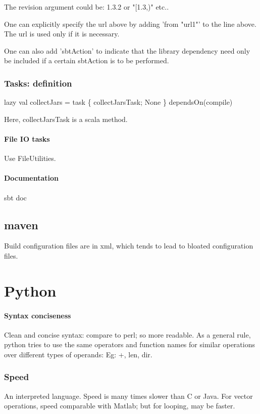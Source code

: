 The revision argument could be: 1.3.2 or "[1.3,)" etc..

One can explicitly specify the url above by adding 'from "url1"' to the line above. The url is used only if it is necessary.

One can also add 'sbtAction' to indicate that the library dependency need only be included if a certain sbtAction is to be performed. \chk

\subsection{Tasks: definition}
lazy val collectJars = task \{ collectJarsTask; None \} dependsOn(compile)

Here, collectJarsTask is a scala method.

\subsubsection{File IO tasks}
Use FileUtilities.

\subsubsection{Documentation}
sbt doc

\section{maven}
Build configuration files are in xml, which tends to lead to bloated configuration files.


\chapter{Python}
\subsubsection{Syntax conciseness}
Clean and concise syntax: compare to perl; so more readable. As a general rule, python tries to use the same operators and function names for similar operations over different types of operands: Eg: +, len, dir.

\subsection{Speed}
An interpreted language. Speed is many times slower than C or Java. For vector operations, speed comparable with Matlab; but for looping, may be faster.

